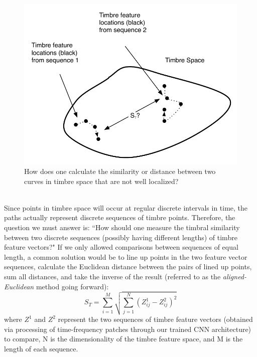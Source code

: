 \documentclass[a4paper,12pt]{report} 	%
\numberwithin{figure}{chapter}
\numberwithin{table}{chapter}
\numberwithin{equation}{chapter}
\begin{document}
\begin{flushleft}
\begin{figure}[h!]
\begin{center}
\includegraphics[scale=0.8]{TimbreDistance2}
\caption[Timbre Distance Between Curves]{How does one calculate the similarity or distance between two curves in timbre space that are not well localized?}
\end{center}
\end{figure}
\\
Since points in timbre space will occur at regular discrete intervals in time, the paths actually represent discrete sequences of timbre points. Therefore, the question we must answer is: ``How should one measure the timbral similarity between two discrete sequences (possibly having different lengths) of timbre feature vectors?" If we only allowed comparisons between sequences of equal length, a common solution would be to line up points in the two feature vector sequences, calculate the Euclidean distance between the pairs of lined up points, sum all distances, and take the inverse of the result (referred to as the \emph{aligned-Euclidean} method going forward):
\begin{equation}
S_T = \sum_{i=1}^{M}\sqrt{\sum_{j=1}^{N}(Z_{ij}^1 - Z_{ij}^2)^2}
\end{equation}
where $Z^1$ and $Z^2$ represent the two sequences of timbre feature vectors (obtained via processing of time-frequency patches through our trained CNN architecture) to compare, N is the dimensionality of the timbre feature space, and M is the length of each sequence.


\end{flushleft}
\end{document}
